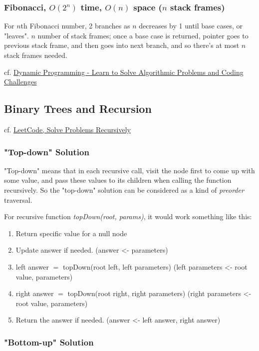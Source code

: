 \documentclass[10pt]{amsart}
\begin{document}
\subsubsection{Fibonacci, $O(2^n)$ time, $O(n)$ space ($n$ stack frames)}

For $n$th Fibonacci number, 2 branches as $n$ decreases by 1 until base cases, or "leaves". $n$ number of stack frames; once a base case is returned, pointer goes to previous stack frame, and then goes into next branch, and so there's at most $n$ stack frames needed.


cf. \href{https://youtu.be/oBt53YbR9Kk?t=1190}{Dynamic Programming - Learn to Solve Algorithmic Problems and Coding Challenges}


\subsection{Binary Trees and Recursion}

cf. \href{https://leetcode.com/explore/learn/card/data-structure-tree/17/solve-problems-recursively/534/}{LeetCode, Solve Problems Recursively}

\subsubsection{"Top-down" Solution}

"Top-down" means that in each recursive call, visit the node first to come up with some value, and pass these values to its children when calling the function recursively. So the "top-down" solution can be considered as a kind of \emph{preorder} traversal.

For recursive function \emph{topDown(root, params)}, it would work something like this:

\begin{enumerate}
	\item Return specific value for a null node
	\item Update answer if needed. (answer <- parameters)
	\item left answer $=$ topDown(root left, left parameters) (left parameters <- root value, parameters)
	\item right answer $=$ topDown(root right, right parameters) (right parameters <- root value, parameters)
	\item Return the answer if needed. (answer <- left answer, right answer)
\end{enumerate}

\subsubsection{"Bottom-up" Solution}
\end{document}
